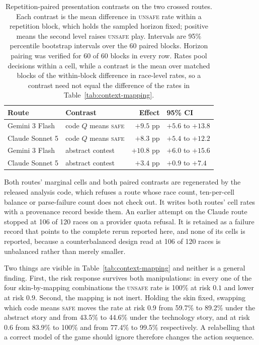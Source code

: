 \documentclass{article}
\newcommand{\Safe}{\textsc{safe}}
\newcommand{\Unsafe}{\textsc{unsafe}}
\begin{document}
\begin{table}[t]
    \caption{Repetition-paired presentation contrasts on the two crossed
    routes. Each contrast is the mean difference in \Unsafe{} rate within a
    repetition block, which holds the sampled horizon fixed; positive means the
    second level raises \Unsafe{} play. Intervals are 95\% percentile
    bootstrap intervals over the 60 paired blocks. Horizon pairing was verified
    for 60 of 60 blocks in every row. Rates pool decisions within a cell,
    while a contrast is the mean over matched blocks of the within-block
    difference in race-level rates, so a contrast need not equal the
    difference of the rates in Table~\ref{tab:context-mapping}.}
    \label{tab:context-mapping-paired}
    \centering
    \small
    \begin{tabular}{@{}llrl@{}}
        \toprule
        Route & Contrast & Effect & 95\% CI \\
        \midrule
        Gemini 3 Flash   & code $Q$ means \Safe{} & $+9.5$ pp & $+5.6$ to $+13.8$ \\
        Claude Sonnet 5  & code $Q$ means \Safe{} & $+8.3$ pp & $+5.4$ to $+12.2$ \\
        \midrule
        Gemini 3 Flash   & abstract contest        & $+10.8$ pp & $+6.0$ to $+15.6$ \\
        Claude Sonnet 5  & abstract contest        & $+3.4$ pp & $+0.9$ to $+7.4$ \\
        \bottomrule
    \end{tabular}
\end{table}

Both routes' marginal cells and both paired contrasts are regenerated by the
released analysis code, which refuses a route whose race count, ten-per-cell
balance or parse-failure count does not check out. It writes both routes' cell
rates with a provenance record beside them. An earlier attempt on the Claude
route stopped at 106 of 120 races on a provider quota refusal. It is retained
as a failure record that points to the complete rerun reported here, and none
of its cells is reported, because a counterbalanced design read at 106 of 120
races is unbalanced rather than merely smaller.

Two things are visible in Table~\ref{tab:context-mapping} and neither is a
general finding. First, the risk response survives both manipulations: in
every one of the four skin-by-mapping combinations the \Unsafe{} rate is
100\% at risk $0.1$ and lower at risk $0.9$. Second, the mapping is not
inert. Holding the skin fixed, swapping which code means \Safe{} moves the
rate at risk $0.9$ from 59.7\% to 89.2\% under the abstract story and from
43.5\% to 44.6\% under the technology story, and at risk $0.6$ from 83.9\% to
100\% and from 77.4\% to 99.5\% respectively. A relabelling that a correct
model of the game should ignore therefore changes the action sequence.
\end{document}
